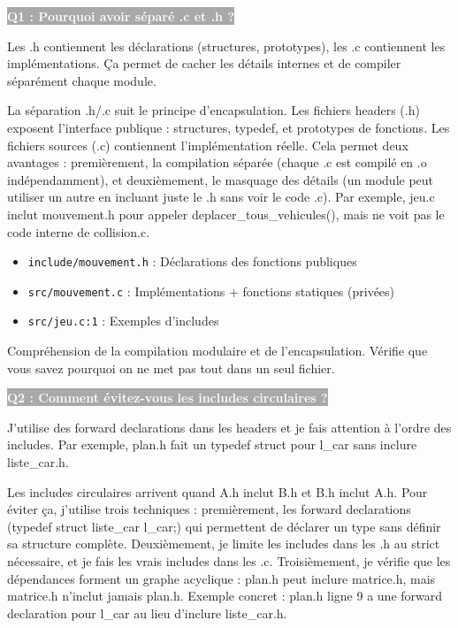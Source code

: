 \documentclass[12pt,a4paper]{article}
\newcommand{\question}[1]{%
    \vspace{0.5cm}
    \noindent\colorbox{darkgray}{\textcolor{white}{\textbf{#1}}}
    \vspace{0.3cm}
}
\begin{document}
\question{Q1 : Pourquoi avoir séparé .c et .h ?}

\begin{reponse_courte}
Les .h contiennent les déclarations (structures, prototypes), les .c contiennent les implémentations. Ça permet de cacher les détails internes et de compiler séparément chaque module.
\end{reponse_courte}

\begin{reponse_longue}
La séparation .h/.c suit le principe d'encapsulation. Les fichiers headers (.h) exposent l'interface publique : structures, typedef, et prototypes de fonctions. Les fichiers sources (.c) contiennent l'implémentation réelle. Cela permet deux avantages : premièrement, la compilation séparée (chaque .c est compilé en .o indépendamment), et deuxièmement, le masquage des détails (un module peut utiliser un autre en incluant juste le .h sans voir le code .c). Par exemple, jeu.c inclut mouvement.h pour appeler deplacer\_tous\_vehicules(), mais ne voit pas le code interne de collision.c.
\end{reponse_longue}

\begin{reference_code}
\begin{itemize}
    \item \texttt{include/mouvement.h} : Déclarations des fonctions publiques
    \item \texttt{src/mouvement.c} : Implémentations + fonctions statiques (privées)
    \item \texttt{src/jeu.c:1} : Exemples d'includes
\end{itemize}
\end{reference_code}

\begin{objectif_prof}
Compréhension de la compilation modulaire et de l'encapsulation. Vérifie que vous savez pourquoi on ne met pas tout dans un seul fichier.
\end{objectif_prof}

\question{Q2 : Comment évitez-vous les includes circulaires ?}

\begin{reponse_courte}
J'utilise des forward declarations dans les headers et je fais attention à l'ordre des includes. Par exemple, plan.h fait un typedef struct pour l\_car sans inclure liste\_car.h.
\end{reponse_courte}

\begin{reponse_longue}
Les includes circulaires arrivent quand A.h inclut B.h et B.h inclut A.h. Pour éviter ça, j'utilise trois techniques : premièrement, les forward declarations (typedef struct liste\_car l\_car;) qui permettent de déclarer un type sans définir sa structure complète. Deuxièmement, je limite les includes dans les .h au strict nécessaire, et je fais les vrais includes dans les .c. Troisièmement, je vérifie que les dépendances forment un graphe acyclique : plan.h peut inclure matrice.h, mais matrice.h n'inclut jamais plan.h. Exemple concret : plan.h ligne 9 a une forward declaration pour l\_car au lieu d'inclure liste\_car.h.
\end{reponse_longue}
\end{document}
